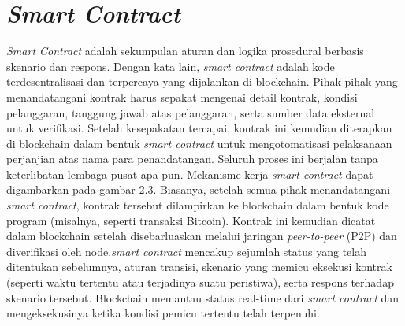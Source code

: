 \section{\emph{Smart Contract}}
\label{sec:smartcontract}
\emph{Smart Contract} adalah sekumpulan aturan dan logika prosedural berbasis skenario dan respons. Dengan kata lain, \emph{smart contract} adalah kode terdesentralisasi dan terpercaya yang dijalankan di blockchain. Pihak-pihak yang menandatangani kontrak harus sepakat mengenai detail kontrak, kondisi pelanggaran, tanggung jawab atas pelanggaran, serta sumber data eksternal untuk verifikasi. Setelah kesepakatan tercapai, kontrak ini kemudian diterapkan di blockchain dalam bentuk \emph{smart contract} untuk mengotomatisasi pelaksanaan perjanjian atas nama para penandatangan. Seluruh proses ini berjalan tanpa keterlibatan lembaga pusat apa pun. Mekanisme kerja \emph{smart contract} dapat digambarkan pada gambar 2.3. Biasanya, setelah semua pihak menandatangani \emph{smart contract}, kontrak tersebut dilampirkan ke blockchain dalam bentuk kode program (misalnya, seperti transaksi Bitcoin). Kontrak ini kemudian dicatat dalam blockchain setelah disebarluaskan melalui jaringan \emph{peer-to-peer} (P2P) dan diverifikasi oleh node.\emph{smart contract} mencakup sejumlah status yang telah ditentukan sebelumnya, aturan transisi, skenario yang memicu eksekusi kontrak (seperti waktu tertentu atau terjadinya suatu peristiwa), serta respons terhadap skenario tersebut. Blockchain memantau status real-time dari \emph{smart contract} dan mengeksekusinya ketika kondisi pemicu tertentu telah terpenuhi\parencite{delmolino2016}.

